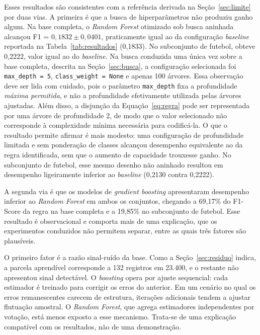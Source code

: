 Esses resultados são consistentes com a referência derivada na Seção~\ref{sec:limite} por duas vias. A primeira é que a busca de hiperparâmetros não produziu ganho algum. Na base completa, o \textit{Random Forest} otimizado sob busca aninhada alcançou F1 = $0{,}1832 \pm 0{,}0401$, praticamente igual ao da configuração \textit{baseline} reportada na Tabela~\ref{tab:resultados} (0{,}1833). No subconjunto de futebol, obteve 0{,}2222, valor igual ao do \textit{baseline}. Na busca conduzida uma única vez sobre a base completa, descrita na Seção~\ref{sec:busca}, a configuração selecionada foi \texttt{max\_depth = 5}, \texttt{class\_weight = None} e apenas 100 árvores. Essa observação deve ser lida com cuidado, pois o parâmetro \texttt{max\_depth} fixa a profundidade \textit{máxima permitida}, e não a profundidade efetivamente utilizada pelas árvores ajustadas. Além disso, a disjunção da Equação~\ref{eq:regra} pode ser representada por uma árvore de profundidade 2, de modo que o valor selecionado não corresponde à complexidade mínima necessária para codificá-la. O que o resultado permite afirmar é mais modesto: uma configuração de profundidade limitada e sem ponderação de classes alcançou desempenho equivalente ao da regra identificada, sem que o aumento de capacidade trouxesse ganho. No subconjunto de futebol, esse mesmo desenho não aninhado resultou em desempenho ligeiramente inferior ao \textit{baseline} (0{,}2130 contra 0{,}2222).

A segunda via é que os modelos de \textit{gradient boosting} apresentaram desempenho inferior ao \textit{Random Forest} em ambos os conjuntos, chegando a 69{,}17\% do F1-Score da regra na base completa e a 19{,}85\% no subconjunto de futebol. Esse resultado é observacional e comporta mais de uma explicação, que os experimentos conduzidos não permitem separar, entre as quais três fatores são plausíveis.

O primeiro fator é a razão sinal-ruído da base. Como a Seção~\ref{sec:residuo} indica, a parcela aprendível corresponde a 132 registros em 23.400, e o restante não apresentou sinal detectável. O \textit{boosting} opera por ajuste sequencial: cada estimador é treinado para corrigir os erros do anterior. Em um cenário no qual os erros remanescentes carecem de estrutura, iterações adicionais tendem a ajustar flutuação amostral. O \textit{Random Forest}, que agrega estimadores independentes por votação, está menos exposto a esse mecanismo. Trata-se de uma explicação compatível com os resultados, não de uma demonstração.

